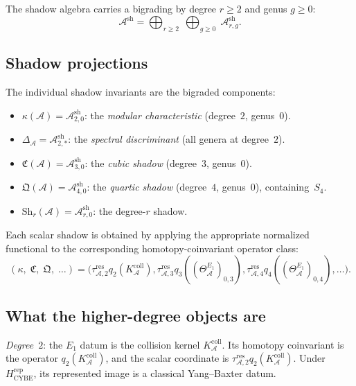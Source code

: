 \documentclass[11pt,reqno]{amsart}
\theoremstyle{definition}
\theoremstyle{remark}
\newcommand{\cA}{\mathcal{A}}
\newcommand{\Eone}{E_1}
\newcommand{\Ash}{\cA^{\mathrm{sh}}}
\newcommand{\Sh}{\mathrm{Sh}}
\numberwithin{equation}{section}
\begin{document}
The shadow algebra carries a bigrading by degree $r \ge 2$ and
genus $g \ge 0$:
\begin{equation}\label{eq:shadow-bigrading}
\Ash = \bigoplus_{r \ge 2}\;\bigoplus_{g \ge 0}\;
\Ash_{r,g}.
\end{equation}

\subsection{Shadow projections}

The individual shadow invariants are the bigraded components:
\begin{itemize}
\item $\kappa(\cA) = \Ash_{2,0}$: the \emph{modular
 characteristic} (degree~$2$, genus~$0$).
\item $\Delta_\cA = \Ash_{2,*}$: the \emph{spectral
 discriminant} (all genera at degree~$2$).
\item $\mathfrak{C}(\cA) = \Ash_{3,0}$: the \emph{cubic
 shadow} (degree~$3$, genus~$0$).
\item $\mathfrak{Q}(\cA) = \Ash_{4,0}$: the \emph{quartic
 shadow} (degree~$4$, genus~$0$), containing~$S_4$.
\item $\Sh_r(\cA) = \Ash_{r,0}$: the degree-$r$ shadow.
\end{itemize}

Each scalar shadow is obtained by applying the appropriate normalized
functional to the corresponding homotopy-coinvariant operator class:
\begin{equation}\label{eq:shadow-from-e1}
(\kappa,\;\mathfrak{C},\;\mathfrak{Q},\;\ldots)
= \bigl(
\tau_{\cA,2}^{\mathrm{res}}q_2(K_\cA^{\mathrm{coll}}),
\tau_{\cA,3}^{\mathrm{res}}q_3((\Theta_\cA^{\Eone})_{0,3}),
\tau_{\cA,4}^{\mathrm{res}}q_4((\Theta_\cA^{\Eone})_{0,4}),
\ldots\bigr).
\end{equation}

\subsection{What the higher-degree objects are}

\noindent
\emph{Degree~$2$}: the $\Eone$ datum is the collision kernel
$K_\cA^{\mathrm{coll}}$.  Its homotopy coinvariant is the operator
$q_2(K_\cA^{\mathrm{coll}})$, and the scalar coordinate is
$\tau_{\cA,2}^{\mathrm{res}}q_2(K_\cA^{\mathrm{coll}})$.  Under
$H_{\mathrm{CYBE}}^{\mathrm{rep}}$, its represented image is a
classical Yang--Baxter datum.
\end{document}
